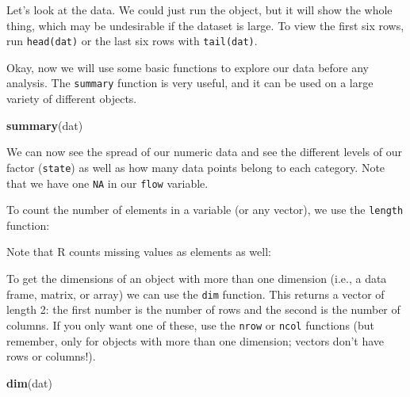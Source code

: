 \documentclass[]{book}
\newenvironment{Shaded}{\begin{snugshade}}{\end{snugshade}}
\newcommand{\KeywordTok}[1]{\textcolor[rgb]{0.13,0.29,0.53}{\textbf{#1}}}
\newcommand{\OperatorTok}[1]{\textcolor[rgb]{0.81,0.36,0.00}{\textbf{#1}}}
\newcommand{\NormalTok}[1]{#1}
\theoremstyle{definition}
\theoremstyle{definition}
\theoremstyle{definition}
\theoremstyle{remark}
\begin{document}
Let's look at the data. We could just run the object, but it will show
the whole thing, which may be undesirable if the dataset is large. To
view the first six rows, run \texttt{head(dat)} or the last six rows
with \texttt{tail(dat)}.

Okay, now we will use some basic functions to explore our data before
any analysis. The \texttt{summary} function is very useful, and it can
be used on a large variety of different objects.

\begin{Shaded}
\begin{Highlighting}[]
\KeywordTok{summary}\NormalTok{(dat)}
\end{Highlighting}
\end{Shaded}

We can now see the spread of our numeric data and see the different
levels of our factor (\texttt{state}) as well as how many data points
belong to each category. Note that we have one \texttt{NA} in our
\texttt{flow} variable.

To count the number of elements in a variable (or any vector), we use
the \texttt{length} function:

\begin{Shaded}
\end{Shaded}

Note that R counts missing values as elements as well:

\begin{Shaded}
\end{Shaded}

To get the dimensions of an object with more than one dimension (i.e., a
data frame, matrix, or array) we can use the \texttt{dim} function. This
returns a vector of length 2: the first number is the number of rows and
the second is the number of columns. If you only want one of these, use
the \texttt{nrow} or \texttt{ncol} functions (but remember, only for
objects with more than one dimension; vectors don't have rows or
columns!).

\begin{Shaded}
\begin{Highlighting}[]
\KeywordTok{dim}\NormalTok{(dat)}
\end{Highlighting}
\end{Shaded}
\end{document}

